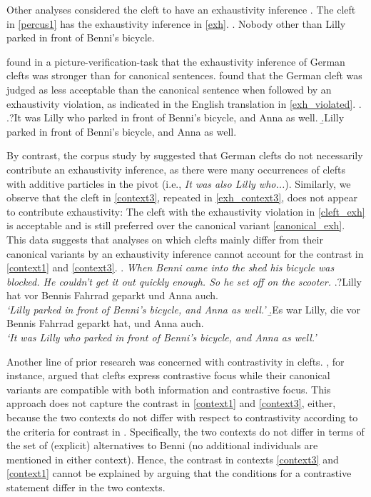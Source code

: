 \documentclass{salt}
\begin{document}
Other analyses considered the cleft to have an exhaustivity inference \cite[e.g.,][]{buring_kriz_2013,horn_1981}. The cleft in \ref{percus1} has the exhaustivity inference in \ref{exh}.
\ex.\label{exh} Nobody other than Lilly parked in front of Benni's bicycle.

\cite{deveaugh-geiss_et_al_2018b} found in a picture-verification-task that the exhaustivity inference of German clefts was stronger than for canonical sentences. \cite{deveaugh-geiss_et_al_2015} found that the German cleft was judged as less acceptable than the canonical sentence when followed by an exhaustivity violation, as indicated in the English translation in \ref{exh_violated}. 
\ex.\label{exh_violated} 
\a.?\label{exh_violated-a}It was Lilly who parked in front of Benni's bicycle, and Anna as well.
\b.\label{exh_violated-b}Lilly parked in front of Benni's bicycle, and Anna as well.

By contrast, the corpus study by \cite{pavlovic_2019} suggested that German clefts do not necessarily contribute an exhaustivity inference, as there were many occurrences of clefts with additive particles in the pivot (i.e., \textit{It was also Lilly who...}). Similarly, we observe that the cleft in \ref{context3}, repeated in \ref{exh_context3}, does not appear to contribute exhaustivity: The cleft with the exhaustivity violation in \ref{cleft_exh} is acceptable and is still preferred over the canonical variant \ref{canonical_exh}. This data suggests that analyses on which clefts mainly differ from their canonical variants by an exhaustivity inference cannot account for the contrast in \ref{context1} and \ref{context3}.
\ex. \textit{When Benni came into the shed his bicycle was blocked. He couldn't get it out quickly enough. So he set off on the scooter.}\label{exh_context3} 
 \a.?\label{canonical_exh}Lilly hat vor Bennis Fahrrad geparkt und Anna auch.\\
\textit{`Lilly parked in front of Benni's bicycle, and Anna as well.'}
\b.\label{cleft_exh}Es war Lilly, die vor Bennis Fahrrad geparkt hat, und Anna auch.\\
\textit{`It was Lilly who parked in front of Benni's bicycle, and Anna as well.'}

Another line of prior research was concerned with contrastivity in clefts. \cite{rochemont_1986}, for instance, argued that clefts express contrastive focus while their canonical variants are compatible with both information and contrastive focus. This approach does not capture the contrast in \ref{context1} and \ref{context3}, either, because the two contexts do not differ with respect to contrastivity according to the criteria for contrast in \cite{repp_2010}. Specifically, the two contexts do not differ in terms of the set of (explicit) alternatives to Benni (no additional individuals are mentioned in either context). Hence, the contrast in contexts \ref{context3} and \ref{context1} cannot be explained by arguing that the conditions for a contrastive statement differ in the two contexts.
\end{document}
